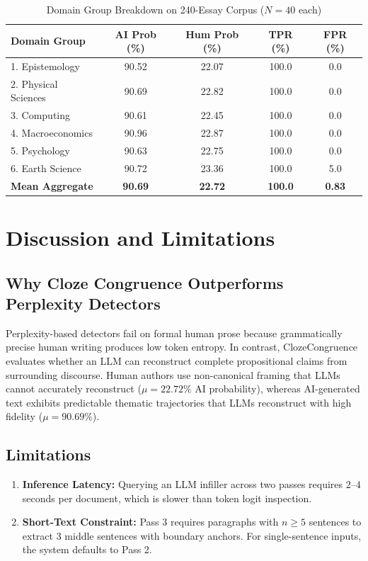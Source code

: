 \documentclass[conference]{IEEEtran}
\begin{document}
\begin{table}[t]
\caption{Domain Group Breakdown on 240-Essay Corpus ($N=40$ each)}
\label{tab:domain_breakdown}
\centering
\begin{tabular}{lcccc}
\toprule
\textbf{Domain Group} & \textbf{AI Prob (\%)} & \textbf{Hum Prob (\%)} & \textbf{TPR (\%)} & \textbf{FPR (\%)} \\
\midrule
1. Epistemology & 90.52 & 22.07 & 100.0 & 0.0 \\
2. Physical Sciences & 90.69 & 22.82 & 100.0 & 0.0 \\
3. Computing & 90.61 & 22.45 & 100.0 & 0.0 \\
4. Macroeconomics & 90.96 & 22.87 & 100.0 & 0.0 \\
5. Psychology & 90.63 & 22.75 & 100.0 & 0.0 \\
6. Earth Science & 90.72 & 23.36 & 100.0 & 5.0 \\
\midrule
\textbf{Mean Aggregate} & \textbf{90.69} & \textbf{22.72} & \textbf{100.0} & \textbf{0.83} \\
\bottomrule
\end{tabular}
\end{table}

\section{Discussion and Limitations}
\subsection{Why Cloze Congruence Outperforms Perplexity Detectors}
Perplexity-based detectors fail on formal human prose because grammatically precise human writing produces low token entropy. In contrast, ClozeCongruence evaluates whether an LLM can reconstruct complete propositional claims from surrounding discourse. Human authors use non-canonical framing that LLMs cannot accurately reconstruct ($\mu = 22.72\%$ AI probability), whereas AI-generated text exhibits predictable thematic trajectories that LLMs reconstruct with high fidelity ($\mu = 90.69\%$).

\subsection{Limitations}
\begin{enumerate}
    \item \textbf{Inference Latency:} Querying an LLM infiller across two passes requires $2\text{--}4$ seconds per document, which is slower than token logit inspection.
    \item \textbf{Short-Text Constraint:} Pass 3 requires paragraphs with $n \ge 5$ sentences to extract 3 middle sentences with boundary anchors. For single-sentence inputs, the system defaults to Pass 2.
\end{enumerate}
\end{document}

